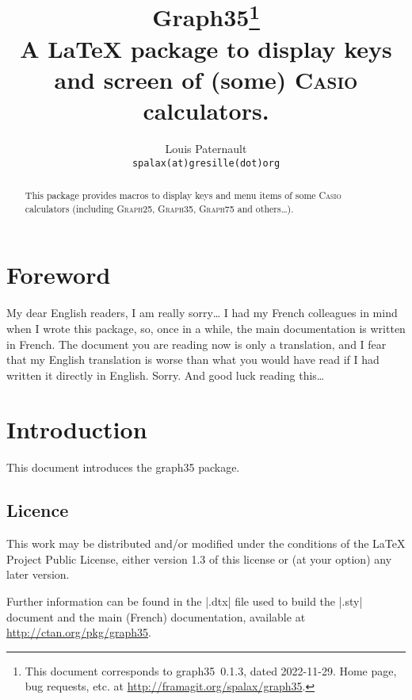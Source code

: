 \documentclass{ltxdoc}
\begin{document}
 \title{Graph35\thanks{
   This document corresponds to \textsf{graph35}~0.1.3, dated 2022-11-29.
   Home page, bug requests, etc. at \url{http://framagit.org/spalax/graph35}.
 }\\A \LaTeX{} package to display keys and screen of (some) \textsc{Casio} calculators.}
 \author{Louis Paternault\\ \texttt{spalax(at)gresille(dot)org}}

 \maketitle

 \begin{abstract}
   This package provides macros to display keys and menu items of some \textsc{Casio} calculators (including \textsc{Graph25}, \textsc{Graph35}, \textsc{Graph75} and others…).
 \end{abstract}

 \section*{Foreword}
 My dear English readers, I am really sorry… I had my French colleagues in mind when I wrote this package, so, once in a while, the main documentation is written in French. The document you are reading now is only a translation, and I fear that my English translation is worse than what you would have read if I had written it directly in English. Sorry. And good luck reading this…

 \setcounter{tocdepth}{2}
 \tableofcontents

 \section{Introduction}
 This document introduces the \textsf{graph35} package.

 \subsection{Licence}

 This work may be distributed and/or modified under the
 conditions of the \LaTeX{} Project Public License, either version 1.3
 of this license or (at your option) any later version.

 Further information can be found in the |.dtx| file used to build the |.sty| document and the main (French) documentation, available at \url{http://ctan.org/pkg/graph35}.
\end{document}
